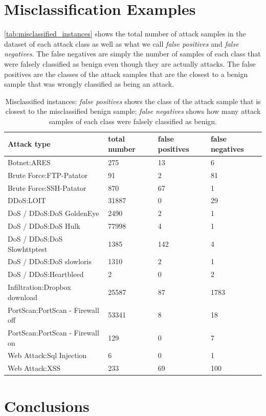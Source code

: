 \documentclass[sigconf,nonacm]{acmart}
\begin{document}
\section{Misclassification Examples}
\autoref{tab:misclassified_instances} shows the total number of attack samples in the dataset of each attack class as well as what we call \textit{false positives} and \textit{false negatives}. The false negatives are simply the number of samples of each class that were falsely classified as benign even though they are actually attacks. 
The false positives are the classes of the attack samples that are the closest to a benign sample that was wrongly classified as being an attack. 

\begin{table}
\caption{Misclassified instances: \textit{false positives} shows the class of the attack sample that is closest to the misclassified benign sample; \textit{false negatives} shows how many attack samples of each class were falsely classified as benign.}
\label{tab:misclassified_instances}
\begin{tabular}{l l l l} 
\toprule 
Attack type & total number & false positives & false negatives \\
\midrule
Botnet:ARES  & 275 & 13 & 6 \\
Brute Force:FTP-Patator & 91 & 2 & 81 \\
Brute Force:SSH-Patator & 870 & 67 & 1 \\
DDoS:LOIT & 31887 & 0 & 29 \\
DoS / DDoS:DoS GoldenEye & 2490 & 2 & 1 \\
DoS / DDoS:DoS Hulk & 77998 & 4 & 1 \\
DoS / DDoS:DoS Slowhttptest & 1385 & 142 & 4 \\
DoS / DDoS:DoS slowloris & 1310 & 2 & 1 \\
DoS / DDoS:Heartbleed & 2 & 0 & 2 \\
Infiltration:Dropbox download & 25587 & 87 & 1783 \\
PortScan:PortScan - Firewall off & 53341 & 8 & 18 \\
PortScan:PortScan - Firewall on & 129 & 0 & 7 \\
Web Attack:Sql Injection & 6 & 0 & 1 \\
Web Attack:XSS & 233 & 69 & 100 \\
\bottomrule
\end{tabular}
\end{table}


\section{Conclusions}
\end{document}
